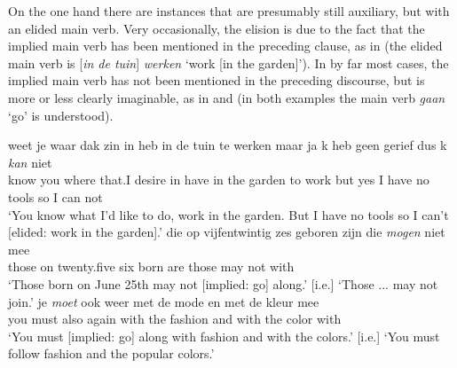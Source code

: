 \documentclass[output=paper]{langsci/langscibook}
\begin{document}
On the one hand there are instances that are presumably still auxiliary, but with an elided main verb. Very occasionally, the elision is due to the fact that the implied main verb has been mentioned in the preceding clause, as in  (the elided main verb is [\textit{in de tuin}] \textit{werken} ‘work [in the garden]’). In by far most cases, the implied main verb has not been mentioned in the preceding discourse, but is more or less clearly imaginable, as in  and  (in both examples the main verb \textit{gaan} ‘go’ is understood).

\ea
    \label{ex:nuyts:4}
    \gll weet je waar da{\textquotesingle}k zin in heb in de tuin te werken maar ja {\textquotesingle}k heb geen gerief dus {\textquotesingle}k \textit{kan} niet\\
  know you where that.I desire in have in the garden to work but yes I have no tools so I can not\\
\glt   `You know what I’d like to do, work in the garden. But I have no tools so I can’t [elided: work in the garden].'
\ex
    \label{ex:nuyts:5}
    \gll die op vijfentwintig zes geboren zijn die \textit{mogen} niet mee\\
       those on twenty.five six born are those may not with   \\
    \glt  [lit.] `Those born on June 25th may not [implied: go] along.' [i.e.] `Those ... may not join.'
\ex
    \label{ex:nuyts:6}
    \gll je \textit{moet} ook weer met de mode en met de kleur mee\\
    you must also again with the fashion and with the color with\\
    \glt  [lit.] `You must [implied: go] along with fashion and with the colors.' [i.e.] `You must follow fashion and the popular colors.'
    \z
\end{document}
